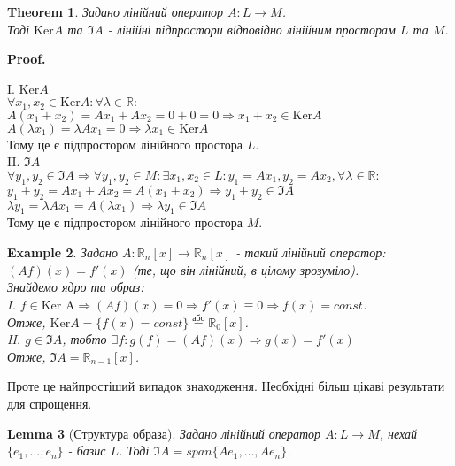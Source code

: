 \documentclass[a4paper, 10pt]{article}
\makeatletter
\def\qed{$\blacksquare$}
\def\ker#1{\textrm{Ker} {#1}}
\theoremstyle{theoremdd}
\newtheorem{theorem}{Theorem}[subsection]
\theoremstyle{theoremdd}
\theoremstyle{theoremdd}
\theoremstyle{theoremdd}
\newtheorem{example}[theorem]{Example}
\theoremstyle{theoremdd}
\theoremstyle{theoremdd}
\theoremstyle{theoremdd}
\newtheorem{lemma}[theorem]{Lemma}
\theoremstyle{theoremdd}
\renewenvironment{proof}[1][Proof.\\]{\par
\pushQED{\hfill \qed}%
\normalfont \topsep6\p@\@plus6\p@\relax
\trivlist
\item\relax
{\bfseries
#1\@addpunct{.}}\hspace\labelsep\ignorespaces
}{%
\popQED\endtrivlist\@endpefalse
}
\makeatother
\begin{document}
	\begin{theorem}
	Задано лінійний оператор $A: L \to M$.\\
	Тоді $\ker A$ та $\Im A$ - лінійні підпростори відповідно лінійним просторам $L$ та $M$.
	\end{theorem}
	
	\begin{proof}
	I. $\ker A$\\
	$\forall x_1, x_2 \in \ker A: \forall \lambda \in \mathbb{R}:$\\
	$A(x_1+x_2)=Ax_1+Ax_2 = 0 + 0 = 0 \Rightarrow x_1+x_2 \in \ker A$\\
	$A(\lambda x_1) = \lambda Ax_1 = 0 \Rightarrow \lambda x_1 \in \ker A$\\
	Тому це є підпростором лінійного простора $L$.
	\bigskip \\
	II. $\Im A$\\
	$\forall y_1, y_2 \in \Im A \Rightarrow \forall y_1, y_2 \in M: \exists x_1, x_2 \in L: y_1 = Ax_1, y_2 = Ax_2, \forall \lambda \in \mathbb{R}:$\\
	$y_1 + y_2 = Ax_1 + Ax_2 = A(x_1+x_2) \Rightarrow y_1+y_2 \in \Im A$\\
	$\lambda y_1 = \lambda Ax_1 = A(\lambda x_1) \Rightarrow \lambda y_1 \in \Im A$\\
	Тому це є підпростором лінійного простора $M$.
	\end{proof}
	
	\begin{example}
	Задано $A: \mathbb{R}_n[x] \to \mathbb{R}_n[x]$ - такий лінійний оператор:\\
	$(Af)(x) = f'(x)$ (те, що він лінійний, в цілому зрозуміло).\\
	Знайдемо ядро та образ:\\
	I. $f \in \textrm{Ker A} \Rightarrow (Af)(x) = 0 \Rightarrow f'(x) \equiv 0 \Rightarrow f(x) = const$.\\
	Отже, $\ker A = \{ f(x) = const\} \overset{\textrm{або}}{=} \mathbb{R}_0[x]$.\\
	II. $g \in \Im A$, тобто $\exists f: g(f) = (Af)(x) \Rightarrow g(x) = f'(x)$\\
	Отже, $\Im A = \mathbb{R}_{n-1}[x]$.
	\end{example}

	Проте це найпростіший випадок знаходження. Необхідні більш цікаві результати для спрощення.
	\begin{lemma}[Структура образа]
	Задано лінійний оператор $A: L \to M$, нехай $\{e_1,\dots, e_n\}$ - базис $L$. Тоді $\Im A = span \{Ae_1,\dots, Ae_n\}$.
	\end{lemma}
	
\end{document}
